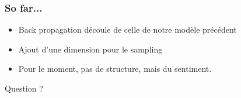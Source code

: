\documentclass{beamer}
\begin{document}

\begin{frame}
\frametitle{So far...}
\begin{itemize}\setlength{\itemsep}{5mm}
\item Back propagation découle de celle de notre modèle précédent
\item Ajout d'une dimension pour le sampling
\item Pour le moment, pas de structure, mais du sentiment.
\end{itemize}
\end{frame}



\begin{frame}
\Huge{\centerline{Question ?}}
\end{frame}

\end{document}
